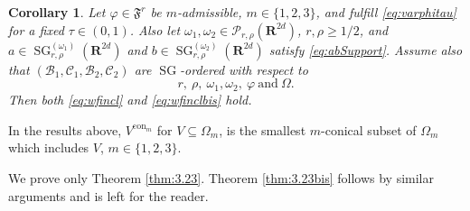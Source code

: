 \documentclass[12pt,a4paper,reqno]{amsart}
\numberwithin{equation}{section}
\numberwithin{thm}{section}
\newtheorem{cor}[thm]{Corollary}
\theoremstyle{definition}
\theoremstyle{remark}
\begin{document}
\par

\begin{cor}
Let $\varphi \in {\mathfrak{F}^r}$ be $m$-admissible, $m\in\{1,2,3\}$, and fulfill \eqref{eq:varphitau}
for a fixed $\tau \in (0,1)$.
Also let $\omega_1,\omega_2\in \mathscr P_{r,\rho}({\mathbf R^{{2d}}})$, $r,\rho \ge 1/2$, and
$a\in{\operatorname{SG}}^{(\omega_1)}_{r,\rho}({\mathbf R^{{2d}}})$ and $b\in{\operatorname{SG}}^{(\omega_2)}_{r,\rho}({\mathbf R^{{2d}}})$
satisfy \eqref{eq:abSupport}.
Assume also that
$({{\mathcal B}}_1,{{\mathcal C}}_1,{{\mathcal B}}_2,{{\mathcal C}}_2)$ are ${\operatorname{SG}}$-ordered with respect to
$$
r,\  \rho,\ \omega _1, \omega_2 ,\ \varphi \ \text{and}\ \Omega  .
$$
Then both \eqref{eq:wfincl} and \eqref{eq:wfinclbis} hold.
\end{cor}

\par

In the results above, $V^{\mathrm{con}_m}$ for $V\subseteq \Omega_m$,
is the smallest $m$-conical subset of $\Omega_m$ which includes $V$, $m\in\{1,2,3\}$.

\medskip

We prove only Theorem \ref{thm:3.23}. Theorem \ref{thm:3.23bis} follows by similar
arguments and is left for the reader.

\par
\end{document}
